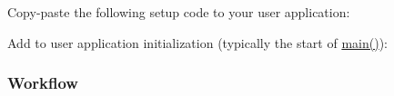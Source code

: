Copy-\/paste the following setup code to your user application\+: 
\begin{DoxyCodeInclude}{0}
\end{DoxyCodeInclude}
 Add to user application initialization (typically the start of {\ttfamily \mbox{\hyperlink{csc__app_8c_a840291bc02cba5474a4cb46a9b9566fe}{main()}}})\+: 
\begin{DoxyCodeInclude}{0}
\end{DoxyCodeInclude}
 \hypertarget{asfdoc_sam0_port_basic_use_case_asfdoc_sam0_port_basic_use_case_setup_flow}{}\subsubsection{Workflow}\label{asfdoc_sam0_port_basic_use_case_asfdoc_sam0_port_basic_use_case_setup_flow}

